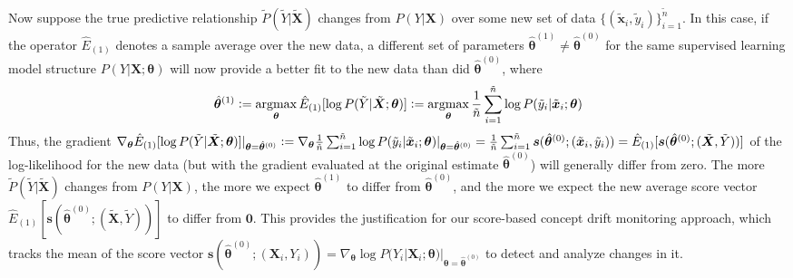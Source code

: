 \documentclass[twoside,11pt]{article}
\DeclareMathOperator*{\argmax}{argmax} %
\begin{document}
Now suppose the true predictive relationship $\tilde{P}(\tilde{Y}|\tilde{\bm{X}})$ changes from $P(Y|\bm{X})$ over some new set of data $\{(\tilde{\bm{x}}_i, \tilde{y}_i)\}_{i=1}^{\tilde{n}}$. In this case, if the operator $\hat{E}_{(1)}$ denotes a sample average over the new data, a different set of parameters $\hat{\bm{\theta}}^{(1)} \neq \hat{\bm{\theta}}^{(0)}$ for the same supervised learning model structure $P(Y|\bm{X};\bm{\theta})$ will now provide a better fit to the new data than did $\hat{\bm{\theta}}^{(0)}$, where 
\begin{align}
\begin{aligned}
\hat{\bm{\theta}}^{(1)} \vcentcolon= \argmax_{\bm{\theta}}\hat{E}_{(1)}[\log{P(\tilde{Y}|\tilde{\bm{X}}; \bm{\theta})}] \vcentcolon= \argmax_{\bm{\theta}}\frac{1}{\tilde{n}}\sum_{i=1}^{\tilde{n}} \log{P(\tilde{y}_i|\tilde{\bm{x}}_i;\bm{\theta})}
\end{aligned}
\label{eqn:score_exp_nonzero_emp}
\end{align}   
Thus, the gradient $\nabla_{\bm{\theta}}\hat{E}_{(1)}[\log{P(\tilde{Y} | \tilde{\bm{X}}; {\bm{\theta}})}]|_{\bm{\theta}=\hat{\bm{\theta}}^{(0)}} \vcentcolon= \nabla_{\bm{\theta}}\frac{1}{\tilde{n}}\sum_{i=1}^{\tilde{n}} \log{P(\tilde{y}_i | \tilde{\bm{x}}_i; {\bm{\theta}})}|_{\bm{\theta}=\hat{\bm{\theta}}^{(0)}} = \\ \frac{1}{\tilde{n}} \sum_{i=1}^{\tilde{n}} \bm{s}(\hat{\bm{\theta}}^{(0)};(\tilde{\bm{x}}_i, \tilde{y}_i)) = \hat{E}_{(1)}[\bm{s}(\hat{\bm{\theta}}^{(0)};(\tilde{\bm{X}}, \tilde{Y}))]$ of the log-likelihood for the new data (but with the gradient evaluated at the original estimate $\hat{\bm{\theta}}^{(0)}$) will generally differ from zero. The more $\tilde{P}(\tilde{Y}|\tilde{\bm{X}})$ changes from $P(Y|\bm{X})$, the more we expect $\hat{\bm{\theta}}^{(1)}$ to differ from $\hat{\bm{\theta}}^{(0)}$, and the more we expect the new average score vector $\hat{E}_{(1)}[\bm{s}(\hat{\bm{\theta}}^{(0)};(\tilde{\bm{X}}, \tilde{Y}))]$ to differ from $\bm{0}$. This provides the justification for our score-based concept drift monitoring approach, which tracks the mean of the score vector $\bm{s}(\hat{\bm{\theta}}^{(0)};(\bm{X}_i, Y_i)) = \nabla_{\bm{\theta}}\log P(Y_i|\bm{X}_i; \bm{\theta})|_{\bm{\theta}=\hat{\bm{\theta}}^{(0)}}$ to detect and analyze changes in it. 
\end{document}
